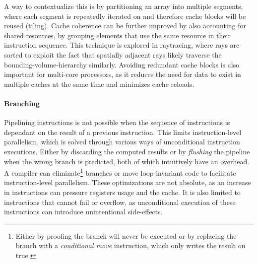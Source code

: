 \documentclass{article}
\begin{document}
A way to contextualize this is by partitioning an array into multiple segments, where each segment is repeatedly iterated on and therefore cache blocks will be reused (tiling).
Cache coherence can be further improved by also accounting for shared resources, by grouping elements that use the same resource in their instruction sequence. 
This technique is explored in raytracing\cite{raytracing-reorder-ray}, where rays are sorted to exploit the fact that spatially adjacent rays likely traverse the bounding-volume-hierarchy similarly.
Avoiding redundant cache blocks is also important for multi-core processors, as it reduces the need for data to exist in multiple caches at the same time and minimizes cache reloads.

\paragraph{Branching}

Pipelining instructions is not possible when the sequence of instructions is dependant on the result of a previous instruction.
This limits instruction-level parallelism, which is solved through various ways of unconditional instruction executions\cite{instruction-level-parallelism}.
Either by discarding the computed results or by {\it flushing} the pipeline when the wrong branch is predicted, both of which intuitively have an overhead.
A compiler can eliminate\footnote{Either by proofing the branch will never be executed or by replacing the branch with a {\it conditional move} instruction, which only writes the result on true.} branches or move loop-invariant code to facilitate instruction-level parallelism\cite{assembly-optimizations}. 
These optimizations are not absolute, as an increase in instructions can pressure registers usage and the cache.  
It is also limited to instructions that cannot fail or overflow, as unconditional execution of these instructions can introduce unintentional side-effects.  
\end{document}
